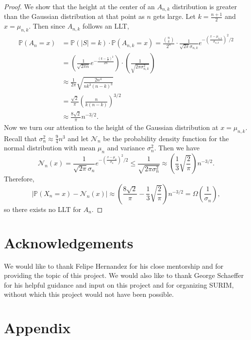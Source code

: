 \documentclass[12pt]{article} %
\newcommand{\p}[1]{\left(#1\right)}
\newcommand{\abs}[1]{\left\lvert#1\right\rvert}
\renewcommand{\P}{\mathbb{P}}
\theoremstyle{definition}
\theoremstyle{definition}
\begin{document}
\begin{proof}
We show that the height at the center of an $A_{n,k}$ distribution is greater than the Gaussian distribution at that point as $n$ gets large. 
Let $k = \frac{n+1}{2}$ and $x = \mu_{n,k}$. Then since $A_{n,k}$ follows an LLT,
\begin{align*}
\P(A_{n} = x) &= \P(|S| = k) \cdot \P(A_{n,k} = x) = \frac{{n\choose k}}{2^n} \cdot \frac{1}{\sqrt{2\pi}\sigma_{n,k}} e^{-\p{\frac{x-\mu_{n,k}}{\sigma_{n,k}}}^2/2} \\
&= \p{\frac{1}{\sqrt{2\pi n}} e^{-\frac{(k-\frac{n}{2})^2}{2n}}} \cdot \p{\frac{1}{\sqrt{2\pi\sigma_{n,k}^2}}} \\
& \approx \frac{1}{2\pi} \sqrt{\frac{2n^4}{nk^3(n-k)^3}} \\
&= \frac{\sqrt{2}}{\pi} \p{\frac{n}{k(n-k)}}^{3/2} \\
&\approx \frac{8\sqrt{2}}{\pi} n^{-3/2}.
\end{align*}
Now we turn our attention to the height of the Gaussian distribution at $x = \mu_{n,k}.$ Recall that $\sigma_n^2 \approx \frac{9}{4}n^3$ and let $\mathcal{N}_n$ be the probability density function for the normal distribution with mean $\mu_n$ and variance $\sigma_n^2$. Then we have
\[ \mathcal{N}_n(x) = \frac{1}{\sqrt{2\pi}\sigma_{n}} e^{-\p{\frac{x-\mu_{n}}{\sigma_{n}}}^2/2} \leq \frac{1}{\sqrt{2\pi\sigma_{n}^2}} \approx \p{\frac{1}{3} \sqrt{\frac{2}{\pi}}} n^{-3/2}.
\]
Therefore,
\[\abs{\P(X_n = x) - \mathcal{N}_n(x)} \approx \p{\frac{8\sqrt{2}}{\pi} - \frac{1}{3} \sqrt{\frac{2}{\pi}}} n^{-3/2} = \Omega\p{\frac{1}{\sigma_n}},\]
so there exists no LLT for $A_n$.


\end{proof}




\section{Acknowledgements}
We would like to thank Felipe Hernandez for his close mentorship and for providing the topic of this project. We would also like to thank George Schaeffer for his helpful guidance and input on this project and for organizing SURIM, without which this project would not have been possible.

\section{Appendix}
\end{document}
